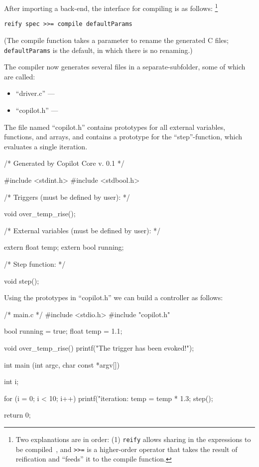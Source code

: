 After importing a back-end, the interface for compiling is as
follows:
%
\footnote{Two explanations are in order: (1) {\tt reify} allows sharing in the
expressions to be compiled~\cite{DSLExtract}, and {\tt >>=} is a higher-order
operator that takes the result of reification and ``feeds'' it to the compile
function.}
%
\begin{lstlisting}[language = Copilot]
reify spec >>= compile defaultParams
\end{lstlisting}
%
\noindent
(The compile function takes a parameter to rename the generated C files; {\tt
defaultParams} is the default, in which there is no renaming.)

The compiler now generates several files in a separate-subfolder, some of which are called:

\begin{itemize}
\item ``driver.c'' ---
\item ``copilot.h'' ---
\end{itemize}

The file named ``copilot.h'' contains prototypes for all external variables,
functions, and arrays, and contains a prototype for the ``step''-function,
which evaluates a single iteration.

\begin{code}
/* Generated by Copilot Core v. 0.1 */

#include <stdint.h>
#include <stdbool.h>

/* Triggers (must be defined by user): */

void over_temp_rise();

/* External variables (must be defined by user): */

extern float temp;
extern bool running;

/* Step function: */

void step();
\end{code}

Using the prototypes in ``copilot.h'' we can build a controller as follows:

\begin{code}
/* main.c */
#include <stdio.h>
#include "copilot.h"

bool running = true;
float temp = 1.1;

void over_temp_rise()
{
  printf("The trigger has been evoked!\n");
}

int main (int argc, char const *argv[])
{
  int i;

  for (i = 0; i < 10; i++)
  {
    printf("iteration: %
    temp = temp * 1.3;
    step();
  }

  return 0;
}
\end{code}

